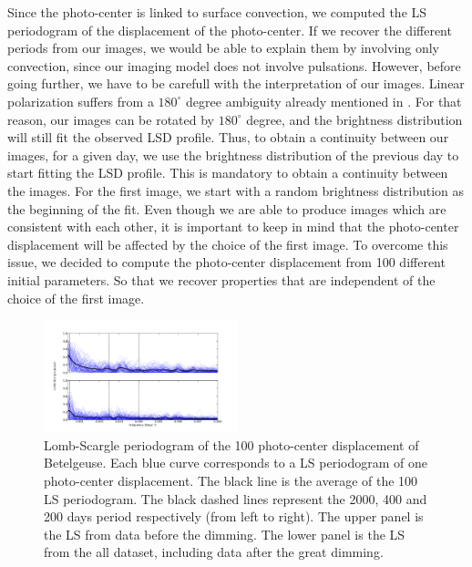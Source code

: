 \documentclass{aa}
\begin{document}
Since the photo-center is linked to surface convection, 
we computed the LS periodogram of the displacement of the photo-center. If we recover the different periods from our images, we would
be able to explain them by involving only convection, since our imaging model does not involve pulsations. However, before going further, we have to be carefull with the interpretation of our images. 
Linear polarization suffers from a $180 ^\circ$ degree ambiguity already mentioned in \cite{auriere_discovery_2016}. For that reason, our images can be 
rotated by $180^\circ$ degree, and the brightness distribution will still fit the observed LSD profile. Thus, to obtain a continuity between our images, 
for a given day, we use the brightness distribution of the previous day to start fitting the LSD profile. This is mandatory to obtain a continuity between the images. For the first image, we start with a 
random brightness distribution as the beginning of the fit. Even though we are able to produce images which are consistent with each other, it is important 
to keep in mind that the photo-center displacement will be affected by the choice of the first image. To overcome this issue, we decided to compute
the photo-center displacement from 100 different initial parameters. So that we recover properties that are independent of the choice of the first image. 

\begin{figure}[!h]
    \centering
    \includegraphics[width=0.5\textwidth]{Lomb-Scargle Photo-center.png}
    \caption{Lomb-Scargle periodogram of the 100 photo-center displacement of Betelgeuse. Each blue curve corresponds to a LS periodogram of one photo-center
     displacement. The black line is the average of the 100 LS periodogram. The black dashed lines represent the 2000, 400 and 200 days period respectively 
     (from left to right). The upper panel is the LS from data before the dimming. The lower panel is the LS from the all dataset, 
     including data after the great dimming. }
    \label{LS photocenter}
\end{figure}
\end{document}
